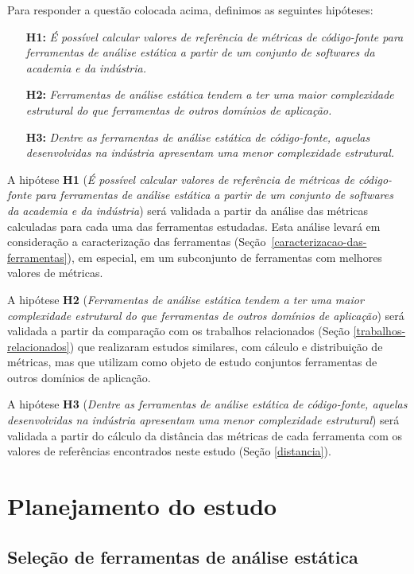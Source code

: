 Para responder a questão colocada acima, definimos as seguintes hipóteses:

\begin{enumerate}
  \item[{\bf H1:}] {\em É possível calcular valores de referência de métricas
    de código-fonte para ferramentas de análise estática a partir de um
    conjunto de softwares da academia e da indústria.}
  \item[{\bf H2:}] {\em Ferramentas de análise estática tendem a ter uma
    maior complexidade estrutural do que ferramentas de outros domínios de
    aplicação.}
  \item[{\bf H3:}] {\em Dentre as ferramentas de análise estática de
    código-fonte, aquelas desenvolvidas na indústria apresentam uma menor
    complexidade estrutural.}
\end{enumerate}

A hipótese {\bf H1} ({\em É possível calcular valores de referência de
métricas de código-fonte para ferramentas de análise estática a partir de um
conjunto de softwares da academia e da indústria}) será validada a partir da
análise das métricas calculadas para cada uma das ferramentas estudadas.  Esta
análise levará em consideração a caracterização das ferramentas
(Seção~\ref{caracterizacao-das-ferramentas}), em especial, em um subconjunto
de ferramentas com melhores valores de métricas.

A hipótese {\bf H2} ({\em Ferramentas de análise estática tendem a ter uma
maior complexidade estrutural do que ferramentas de outros domínios de
aplicação}) será validada a partir da comparação com os trabalhos relacionados
(Seção \ref{trabalhos-relacionados}) que realizaram estudos similares, com
cálculo e distribuição de métricas, mas que utilizam como objeto de estudo
conjuntos ferramentas de outros domínios de aplicação.

A hipótese {\bf H3} ({\em Dentre as ferramentas de análise estática de
código-fonte, aquelas desenvolvidas na indústria apresentam uma menor
complexidade estrutural}) será validada a partir do cálculo da distância das
métricas de cada ferramenta com os valores de referências encontrados neste
estudo (Seção \ref{distancia}).

\section{Planejamento do estudo} \label{planejamento}

\subsection{Seleção de ferramentas de análise estática} \label{levantamento}

